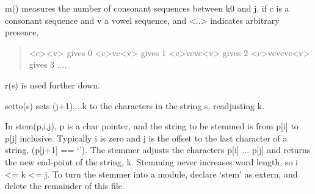 \documentclass[letterpaper,10pt,english]{sphinxmanual}
\begin{document}
\begin{fulllineitems}
\begin{fulllineitems}
\label{\detokenize{porter:porter.PorterStemmer.m}}
m() measures the number of consonant sequences between k0 and j.
if c is a consonant sequence and v a vowel sequence, and \textless{}..\textgreater{}
indicates arbitrary presence,
\begin{quote}

\textless{}c\textgreater{}\textless{}v\textgreater{}       gives 0
\textless{}c\textgreater{}vc\textless{}v\textgreater{}     gives 1
\textless{}c\textgreater{}vcvc\textless{}v\textgreater{}   gives 2
\textless{}c\textgreater{}vcvcvc\textless{}v\textgreater{} gives 3
....
\end{quote}

\end{fulllineitems}


\begin{fulllineitems}
\label{\detokenize{porter:porter.PorterStemmer.r}}
r(s) is used further down.

\end{fulllineitems}


\begin{fulllineitems}
\label{\detokenize{porter:porter.PorterStemmer.setto}}
setto(s) sets (j+1),...k to the characters in the string s, readjusting k.

\end{fulllineitems}


\begin{fulllineitems}
\label{\detokenize{porter:porter.PorterStemmer.stem}}
In stem(p,i,j), p is a char pointer, and the string to be stemmed
is from p{[}i{]} to p{[}j{]} inclusive. Typically i is zero and j is the
offset to the last character of a string, (p{[}j+1{]} == `'). The
stemmer adjusts the characters p{[}i{]} ... p{[}j{]} and returns the new
end-point of the string, k. Stemming never increases word length, so
i \textless{}= k \textless{}= j. To turn the stemmer into a module, declare `stem' as
extern, and delete the remainder of this file.


\end{fulllineitems}
\end{fulllineitems}
\end{document}
